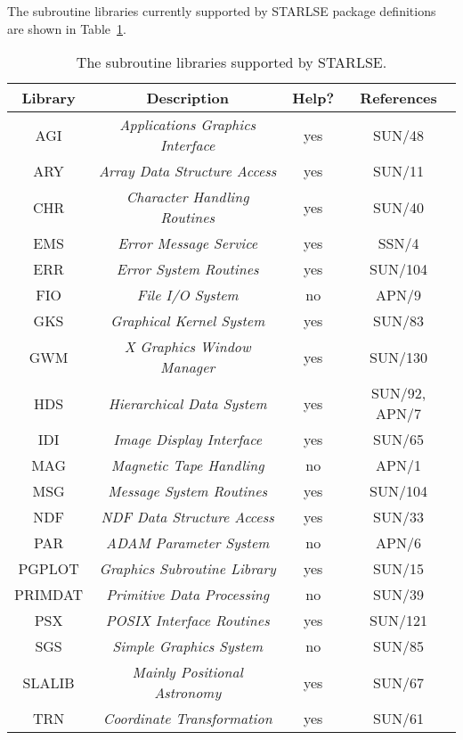 The subroutine libraries currently supported by STARLSE package definitions
are shown in Table~\ref{table:status}.

\begin{table}
\begin{center}
\begin{tabular}{|c|c|c|c|}
\hline
{\bf Library} & {\bf Description} & {\bf Help?} & {\bf References}\\
\hline \hline
AGI & {\em Applications Graphics Interface} & yes & SUN/48 \\
ARY & {\em Array Data Structure Access} & yes & SUN/11 \\
CHR & {\em Character Handling Routines} & yes & SUN/40 \\
EMS & {\em Error Message Service}    & yes & SSN/4 \\
ERR & {\em Error System Routines}    & yes & SUN/104 \\
FIO & {\em File I/O System}          & no & APN/9 \\
GKS & {\em Graphical Kernel System}  & yes & SUN/83 \\
GWM & {\em X Graphics Window Manager}& yes & SUN/130 \\
HDS & {\em Hierarchical Data System} & yes & SUN/92, APN/7 \\
IDI & {\em Image Display Interface}  & yes & SUN/65 \\
MAG & {\em Magnetic Tape Handling} & no & APN/1 \\
MSG & {\em Message System Routines}  & yes & SUN/104 \\
NDF & {\em NDF Data Structure Access} & yes & SUN/33 \\
PAR & {\em ADAM Parameter System}    & no & APN/6 \\
PGPLOT & {\em Graphics Subroutine Library} & yes & SUN/15 \\
PRIMDAT & {\em Primitive Data Processing} & no & SUN/39 \\
PSX & {\em POSIX Interface Routines} & yes & SUN/121 \\
SGS & {\em Simple Graphics System}   & no & SUN/85 \\
SLALIB & {\em Mainly Positional Astronomy} & yes & SUN/67 \\
TRN & {\em Coordinate Transformation} & yes & SUN/61 \\
\hline
\end{tabular}
\caption{The subroutine libraries supported by STARLSE.}
\label{table:status}
\end{center}
\end{table}

